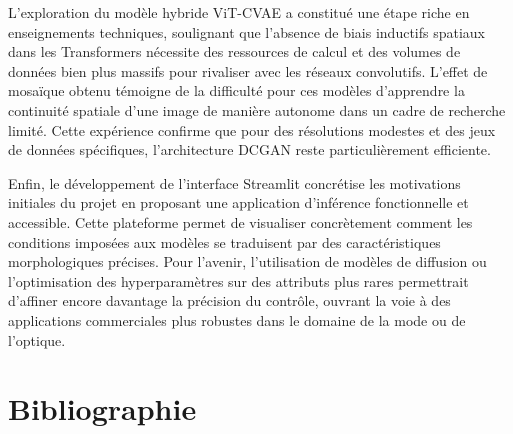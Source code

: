 \documentclass{article}
\begin{document}
L'exploration du modèle hybride ViT-CVAE a constitué une étape riche en enseignements techniques, soulignant que l'absence de biais inductifs spatiaux dans les Transformers nécessite des ressources de calcul et des volumes de données bien plus massifs pour rivaliser avec les réseaux convolutifs. L'effet de mosaïque obtenu témoigne de la difficulté pour ces modèles d'apprendre la continuité spatiale d'une image de manière autonome dans un cadre de recherche limité. Cette expérience confirme que pour des résolutions modestes et des jeux de données spécifiques, l'architecture DCGAN reste particulièrement efficiente.

Enfin, le développement de l'interface Streamlit concrétise les motivations initiales du projet en proposant une application d'inférence fonctionnelle et accessible. Cette plateforme permet de visualiser concrètement comment les conditions imposées aux modèles se traduisent par des caractéristiques morphologiques précises. Pour l'avenir, l'utilisation de modèles de diffusion ou l'optimisation des hyperparamètres sur des attributs plus rares permettrait d'affiner encore davantage la précision du contrôle, ouvrant la voie à des applications commerciales plus robustes dans le domaine de la mode ou de l'optique.

\newpage
\section{Bibliographie}


\end{document}
